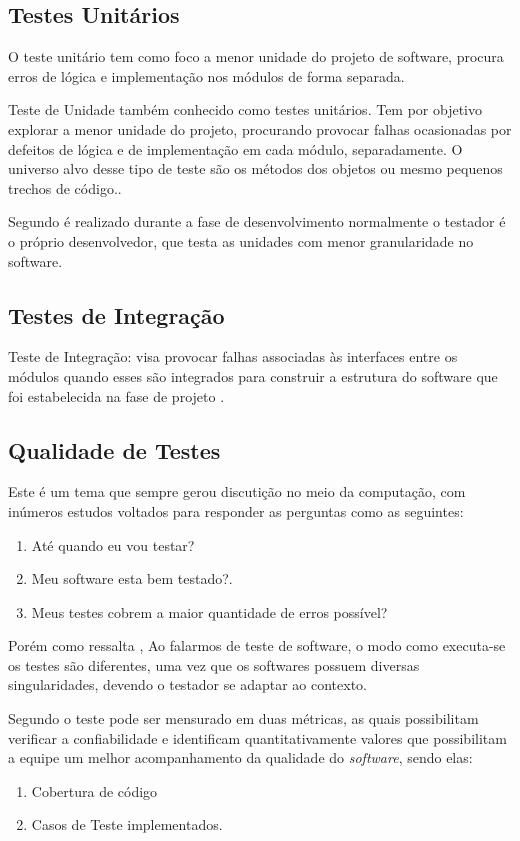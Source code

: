 \subsection{Testes Unitários}
        O teste unitário tem como foco a menor unidade do projeto de software, procura erros de lógica e implementação nos módulos de forma separada.\cite{PRESSMAN} 

         Teste de Unidade também conhecido como testes unitários. Tem por objetivo explorar a menor unidade do projeto, procurando provocar falhas ocasionadas por defeitos de lógica e de implementação em cada módulo, separadamente. O universo alvo desse tipo de teste são os métodos dos objetos ou mesmo pequenos trechos de código.\cite{artigo_intro_teste}.

Segundo \cite{sw_test_tech} é realizado durante a fase de desenvolvimento normalmente o testador é o próprio desenvolvedor, que testa as unidades com menor granularidade no software.
        
        
\subsection{Testes de Integração}

Teste de Integração: visa provocar falhas associadas às interfaces entre os módulos quando esses são integrados para construir a estrutura do software que foi estabelecida na fase de projeto \cite{artigo_intro_teste}.


\subsection{Qualidade de Testes}

Este é um tema que sempre gerou discutição no meio da computação, com inúmeros estudos voltados para responder as perguntas como as seguintes:

\begin{enumerate}
\item Até quando eu vou testar?
\item Meu software esta bem testado?.
\item Meus testes cobrem a maior quantidade de erros possível?
\end{enumerate}

Porém como ressalta \cite{e08}, Ao falarmos de teste de software, o modo como executa-se os testes são diferentes, uma vez que os softwares possuem diversas singularidades, devendo o testador se adaptar ao contexto.

Segundo \cite{e08} o teste pode ser mensurado em duas métricas, as quais possibilitam verificar a confiabilidade e identificam quantitativamente valores que possibilitam a equipe um melhor acompanhamento da qualidade do \textit{software}, sendo elas:
\begin{enumerate}
\item Cobertura de código
\item Casos de Teste implementados.
\end{enumerate}


